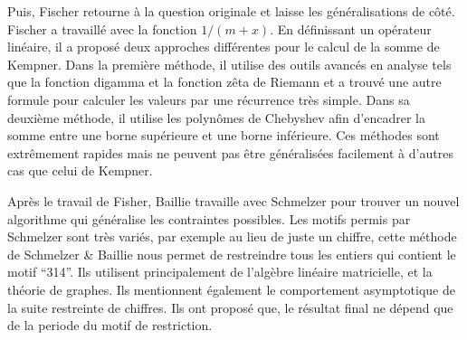 Puis, Fischer \cite{fischer} retourne à la question originale et laisse les
généralisations de côté. Fischer a travaillé avec la fonction $1/(m+x)$. En
définissant un op\'erateur lin\'eaire, il a proposé deux approches différentes pour
le calcul de la somme de Kempner. Dans la première méthode, il utilise des
outils avancés en analyse tels que la fonction digamma et la fonction zêta de
Riemann et a trouvé une autre formule pour calculer les valeurs par une
récurrence très simple. Dans sa deuxième méthode, il utilise les polynômes de
Chebyshev afin d'encadrer la somme entre une borne supérieure et une borne
inférieure. Ces méthodes sont extrêmement rapides mais ne peuvent pas être
généralisées facilement à d'autres cas que celui de Kempner.

Apr\`es le travail de Fisher, Baillie travaille avec Schmelzer \cite{schmelzer}
pour trouver un nouvel algorithme qui g\'en\'eralise les contraintes possibles.
Les motifs permis par Schmelzer sont très variés, par exemple au lieu de juste
un chiffre, cette méthode de Schmelzer \& Baillie nous permet de restreindre
tous les entiers qui contient le motif “314”. Ils utilisent principalement
de l'alg\`ebre lin\'eaire matricielle, et la th\'eorie de graphes.
Ils mentionnent \'egalement le comportement asymptotique de la suite
restreinte de chiffres. Ils ont propos\'e que, le r\'esultat final ne
d\'epend que de la periode du motif de restriction.

